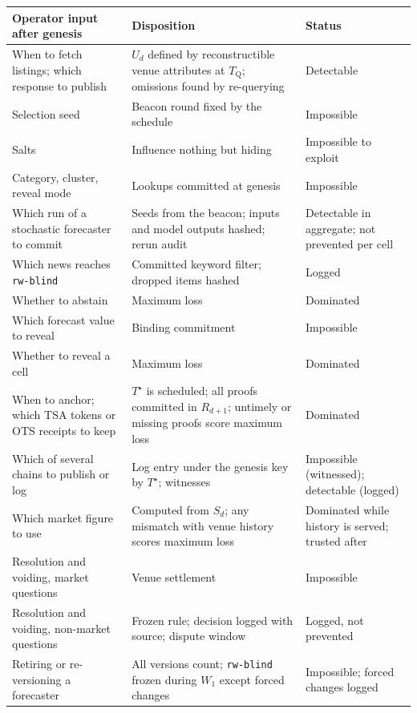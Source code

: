 \documentclass[11pt]{article}
\newcommand{\Ts}{T^{\star}}
\newcommand{\tQ}{T_{\mathrm{Q}}}
\begin{document}
\begin{table}[t]
\centering
\small
\begin{tabularx}{\textwidth}{@{}>{\raggedright\arraybackslash}p{4.3cm}>{\raggedright\arraybackslash}X>{\raggedright\arraybackslash}p{2.5cm}@{}}
\toprule
Operator input after genesis & Disposition & Status \\
\midrule
When to fetch listings; which response to publish & $U_d$ defined by reconstructible venue attributes at $\tQ$; omissions found by re-querying & Detectable \\
Selection seed & Beacon round fixed by the schedule & Impossible \\
Salts & Influence nothing but hiding & Impossible to exploit \\
Category, cluster, reveal mode & Lookups committed at genesis & Impossible \\
Which run of a stochastic forecaster to commit & Seeds from the beacon; inputs and model outputs hashed; rerun audit & Detectable in aggregate; not prevented per cell \\
Which news reaches \texttt{rw-blind} & Committed keyword filter; dropped items hashed & Logged \\
Whether to abstain & Maximum loss & Dominated \\
Which forecast value to reveal & Binding commitment & Impossible \\
Whether to reveal a cell & Maximum loss & Dominated \\
When to anchor; which TSA tokens or OTS receipts to keep & $\Ts$ is scheduled; all proofs committed in $R_{d+1}$; untimely or missing proofs score maximum loss & Dominated \\
Which of several chains to publish or log & Log entry under the genesis key by $\Ts$; witnesses & Impossible (witnessed); detectable (logged) \\
Which market figure to use & Computed from $S_d$; any mismatch with venue history scores maximum loss & Dominated while history is served; trusted after \\
Resolution and voiding, market questions & Venue settlement & Impossible \\
Resolution and voiding, non-market questions & Frozen rule; decision logged with source; dispute window & Logged, not prevented \\
Retiring or re-versioning a forecaster & All versions count; \texttt{rw-blind} frozen during $W_1$ except forced changes & Impossible; forced changes logged \\

\end{tabularx}
\end{table}
\end{document}
